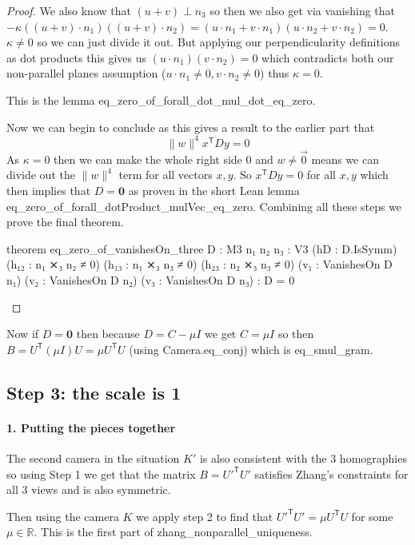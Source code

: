\documentclass[10pt]{article}
\theoremstyle{plain}
\theoremstyle{definition}
\theoremstyle{remark}
\newcommand{\T}{^{\mathsf{T}}}
\newcommand{\lean}[1]{{\ttfamily\let\us\_\def\_{\us\allowbreak}#1}}
\begin{document}
\begin{proof}
  We also know that $(u+v) \perp n_3$ so then we also get via vanishing that $-\kappa ((u+v)\cdot n_1)((u+v) \cdot n_2)=(u\cdot n_1+v\cdot n_1)(u\cdot n_2 + v \cdot n_2)=0$. $\kappa \neq 0$ so we can just divide it out. But applying our perpendicularity definitions as dot products this gives us $(u \cdot n_1)(v \cdot n_2)=0$ which contradicts both our non-parallel planes assumption ($u \cdot n_1 \neq 0, v \cdot n_2 \neq 0$) thus $\kappa = 0$.

  This is the lemma \lean{eq\_zero\_of\_forall\_dot\_mul\_dot\_eq\_zero}.

  Now we can begin to conclude as this gives a result to the earlier part that 
  $$\|w\|^4x\T Dy = 0$$
  As $\kappa=0$ then we can make the whole right side 0 and $w \neq \vec{0}$ means we can divide out the $\|w\|^4$ term for all vectors $x,y$. So $x\T Dy=0$ for all $x,y$ which then implies that $D=\mathbf{0}$ as proven in the short Lean lemma
\lean{eq\_zero\_of\_forall\_dotProduct\_mulVec\_eq\_zero}. 
Combining all these steps we prove the final theorem.
  \begin{leancode}
theorem eq_zero_of_vanishesOn_three {D : M3} {n₁ n₂ n₃ : V3} (hD : D.IsSymm)
    (h₁₂ : n₁ ⨯₃ n₂ ≠ 0) (h₁₃ : n₁ ⨯₃ n₃ ≠ 0) (h₂₃ : n₂ ⨯₃ n₃ ≠ 0)
    (v₁ : VanishesOn D n₁) (v₂ : VanishesOn D n₂) (v₃ : VanishesOn D n₃) :
    D = 0
  \end{leancode}
\end{proof}

  Now if $D=\mathbf{0}$ then because $D=C-\mu I$ we get $C=\mu I$ so then $B=U\T (\mu I)U=\mu U\T  U$ (using \lean{Camera.eq\_conj}) which is \lean{eq\_smul\_gram}.

\subsection{Step 3: the scale is 1}
\paragraph{1. Putting the pieces together}

The second camera in the situation $K'$ is also consistent with the 3 homographies so using Step 1 we get that the matrix $B={U'}\T U'$ satisfies Zhang's constraints for all 3 views and is also symmetric.

Then using the camera $K$ we apply step 2 to find that ${U'}\T U'=\mu U\T U$ for some $\mu \in \mathbb{R}$. This is the first part of \lean{zhang\_nonparallel\_uniqueness}.
\end{document}
